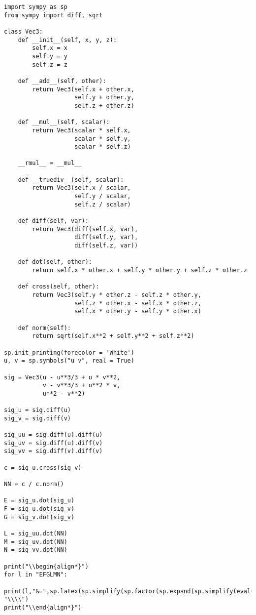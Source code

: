 \documentclass[a4paper,11pt,notitlepage,fullpage]{article}
\begin{document}
\begin{verbatim}
import sympy as sp
from sympy import diff, sqrt

class Vec3:    
    def __init__(self, x, y, z):
        self.x = x
        self.y = y
        self.z = z
        
    def __add__(self, other):
        return Vec3(self.x + other.x,
                    self.y + other.y,
                    self.z + other.z)
        
    def __mul__(self, scalar):
        return Vec3(scalar * self.x,
                    scalar * self.y,
                    scalar * self.z)
    
    __rmul__ = __mul__
    
    def __truediv__(self, scalar):
        return Vec3(self.x / scalar,
                    self.y / scalar,
                    self.z / scalar)
    
    def diff(self, var):
        return Vec3(diff(self.x, var),
                    diff(self.y, var),
                    diff(self.z, var))
        
    def dot(self, other):
        return self.x * other.x + self.y * other.y + self.z * other.z
    
    def cross(self, other):
        return Vec3(self.y * other.z - self.z * other.y,
                    self.z * other.x - self.x * other.z,
                    self.x * other.y - self.y * other.x)
        
    def norm(self):
        return sqrt(self.x**2 + self.y**2 + self.z**2)

sp.init_printing(forecolor = 'White')
u, v = sp.symbols("u v", real = True)

sig = Vec3(u - u**3/3 + u * v**2,
           v - v**3/3 + u**2 * v,
           u**2 - v**2)

sig_u = sig.diff(u)
sig_v = sig.diff(v)

sig_uu = sig.diff(u).diff(u)
sig_uv = sig.diff(u).diff(v)
sig_vv = sig.diff(v).diff(v)

c = sig_u.cross(sig_v)

NN = c / c.norm()

E = sig_u.dot(sig_u)
F = sig_u.dot(sig_v)
G = sig_v.dot(sig_v)

L = sig_uu.dot(NN)
M = sig_uv.dot(NN)
N = sig_vv.dot(NN)

print("\\begin{align*}")
for l in "EFGLMN":
    print(l,"&=",sp.latex(sp.simplify(sp.factor(sp.expand(sp.simplify(eval(l)))))), "\\\\")
print("\\end{align*}")
\end{verbatim}
\end{document}
